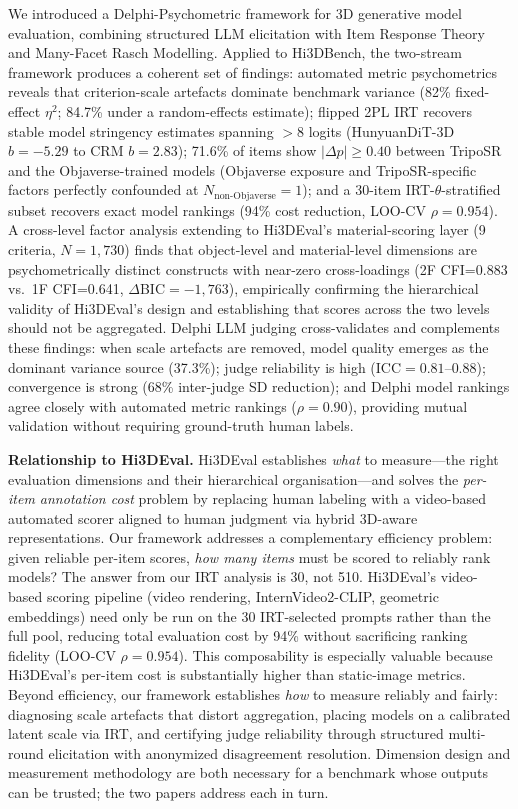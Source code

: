 \documentclass[10pt]{article}
\begin{document}
We introduced a Delphi-Psychometric framework for 3D generative model
evaluation, combining structured LLM elicitation with Item Response Theory
and Many-Facet Rasch Modelling.
Applied to Hi3DBench, the two-stream framework produces a coherent set of
findings: automated metric psychometrics reveals that criterion-scale artefacts
dominate benchmark variance (82\% fixed-effect $\eta^2$; 84.7\% under a
random-effects estimate); flipped 2PL IRT recovers stable model
stringency estimates spanning $>8$ logits (HunyuanDiT-3D $b=-5.29$ to
CRM $b=2.83$); 71.6\% of items show $|\Delta p|\geq0.40$ between TripoSR and
the Objaverse-trained models (Objaverse exposure and TripoSR-specific factors
perfectly confounded at $N_\text{non-Objaverse}=1$); and a 30-item
IRT-$\theta$-stratified subset recovers exact model rankings (94\% cost
reduction, LOO-CV $\rho=0.954$).
A cross-level factor analysis extending to Hi3DEval's material-scoring layer
(9 criteria, $N=1{,}730$) finds that object-level and material-level
dimensions are psychometrically distinct constructs with near-zero
cross-loadings (2F CFI=0.883 vs.\ 1F CFI=0.641, $\Delta$BIC$=-1{,}763$),
empirically confirming the hierarchical validity of Hi3DEval's design and
establishing that scores across the two levels should not be aggregated.
Delphi LLM judging cross-validates and complements these findings:
when scale artefacts are removed, model quality emerges as the dominant
variance source (37.3\%); judge reliability is high (ICC$=0.81$--$0.88$);
convergence is strong (68\% inter-judge SD reduction); and Delphi model
rankings agree closely with automated metric rankings ($\rho=0.90$),
providing mutual validation without requiring ground-truth human labels.

\textbf{Relationship to Hi3DEval.}
Hi3DEval \citep{hi3deval2025} establishes \emph{what} to measure---the right
evaluation dimensions and their hierarchical organisation---and solves the
\emph{per-item annotation cost} problem by replacing human labeling with a
video-based automated scorer aligned to human judgment via hybrid
3D-aware representations.
Our framework addresses a complementary efficiency problem: given reliable
per-item scores, \emph{how many items} must be scored to reliably rank
models?
The answer from our IRT analysis is 30, not 510.
Hi3DEval's video-based scoring pipeline (video rendering, InternVideo2-CLIP,
geometric embeddings) need only be run on the 30 IRT-selected prompts rather
than the full pool, reducing total evaluation cost by 94\% without
sacrificing ranking fidelity (LOO-CV $\rho=0.954$).
This composability is especially valuable because Hi3DEval's per-item cost is
substantially higher than static-image metrics.
Beyond efficiency, our framework establishes \emph{how} to measure reliably
and fairly: diagnosing scale artefacts that distort aggregation, placing
models on a calibrated latent scale via IRT, and certifying judge reliability
through structured multi-round elicitation with anonymized disagreement
resolution.
Dimension design and measurement methodology are both necessary for a
benchmark whose outputs can be trusted; the two papers address each in turn.
\end{document}
